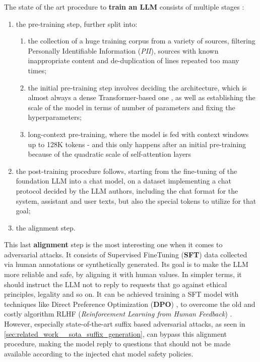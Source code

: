 \documentclass[../thesis.tex]{subfiles}
\begin{document}
The state of the art procedure to \textbf{train an LLM} consists of multiple stages \citep{grattafiori2024llama}:
\begin{enumerate}
    \item the pre-training step, further split into:
    \begin{enumerate}
        \item the collection of a huge training corpus from a variety of sources, filtering Personally Identifiable Information (\emph{PII}), sources with known inappropriate content and de-duplication of lines repeated too many times;
        \item the initial pre-training step involves deciding the architecture, which is almost always a dense Transformer-based one \citep{NIPS2017_attentionisallyouneed}, as well as establishing the scale of the model in terms of number of parameters and fixing the hyperparameters;
        \item long-context pre-training, where the model is fed with context windows up to 128K tokens - and this only happens after an initial pre-training because of the quadratic scale of self-attention layers
    \end{enumerate}

    \item the post-training procedure follows, starting from the fine-tuning of the foundation LLM into a chat model, on a dataset implementing a chat protocol decided by the LLM authors, including the chat format for the system, assistant and user texts, but also the special tokens to utilize for that goal;

    \item the alignment step.
\end{enumerate}

This last \textbf{alignment} step is the most interesting one when it comes to adversarial attacks.
It consists of Supervised FineTuning (\textbf{SFT}) data collected via human annotations or synthetically generated.
Its goal is to make the LLM more reliable and safe, by aligning it with human values. In simpler terms, it should instruct the LLM not to reply to requests that go against ethical principles, legality and so on.
It can be achieved training a SFT model with techniques like Direct Preference Optimization (\textbf{DPO}) \citep{rafailov2023directpreferenceoptimization}, to overcome the old and costly algorithm RLHF (\emph{Reinforcement Learning from Human Feedback}) \citep{zheng2023secretsrlhflargelanguage}.
However, especially state-of-the-art suffix based adversarial attacks, as seen in \cref{sec:related_work__sota_suffix_generation}, can bypass this alignment procedure, making the model reply to questions that should not be made available according to the injected chat model safety policies.
\end{document}
